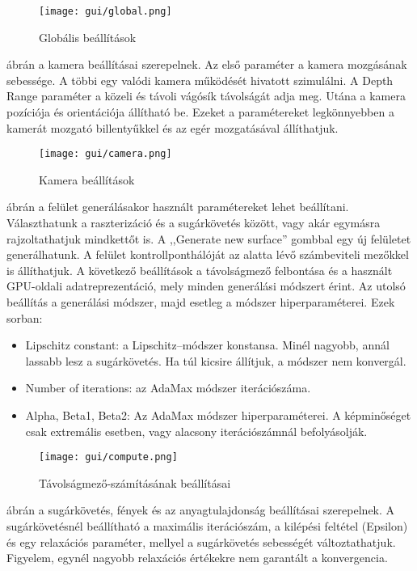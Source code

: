 \begin{figure}[H]
	\centering
	\texttt{[image: gui/global.png]}
	\caption{Globális beállítások}
	\label{fig:global-settings}
\end{figure}

 ábrán a kamera beállításai szerepelnek. Az első paraméter a kamera mozgásának sebessége. A többi egy valódi kamera működését hivatott szimulálni. A Depth Range paraméter a közeli és távoli vágósík távolságát adja meg. Utána a kamera pozíciója és orientációja állítható be. Ezeket a paramétereket legkönnyebben a kamerát mozgató billentyűkkel és az egér mozgatásával állíthatjuk.

\begin{figure}[H]
	\centering
	\texttt{[image: gui/camera.png]}
	\caption{Kamera beállítások}
	\label{fig:camera-settings}
\end{figure}

 ábrán a felület generálásakor használt paramétereket lehet beállítani. Választhatunk a raszterizáció és a sugárkövetés között, vagy akár egymásra rajzoltathatjuk mindkettőt is. A ,,Generate new surface'' gombbal egy új felületet generálhatunk. A felület kontrollponthálóját az alatta lévő számbeviteli mezőkkel is állíthatjuk. A következő beállítások a távolságmező felbontása és a használt GPU-oldali adatreprezentáció, mely minden generálási módszert érint. Az utolsó beállítás a generálási módszer, majd esetleg a módszer hiperparaméterei. Ezek sorban:
\begin{itemize}
	\item Lipschitz constant: a Lipschitz--módszer konstansa. Minél nagyobb, annál lassabb lesz a sugárkövetés. Ha túl kicsire állítjuk, a módszer nem konvergál.
	\item Number of iterations: az AdaMax módszer iterációszáma.
	\item Alpha, Beta1, Beta2: Az AdaMax módszer hiperparaméterei. A képminőséget csak extremális esetben, vagy alacsony iterációszámnál befolyásolják.
\end{itemize}

\begin{figure}[H]
	\centering
	\texttt{[image: gui/compute.png]}
	\caption{Távolságmező-számításának beállításai}
	\label{fig:compute-settings}
\end{figure}

 ábrán a sugárkövetés, fények és az anyagtulajdonság beállításai szerepelnek. A sugárkövetésnél beállítható a maximális iterációszám, a kilépési feltétel (Epsilon) és egy relaxációs paraméter, mellyel a sugárkövetés sebességét változtathatjuk. Figyelem, egynél nagyobb relaxációs értékekre nem garantált a konvergencia.

